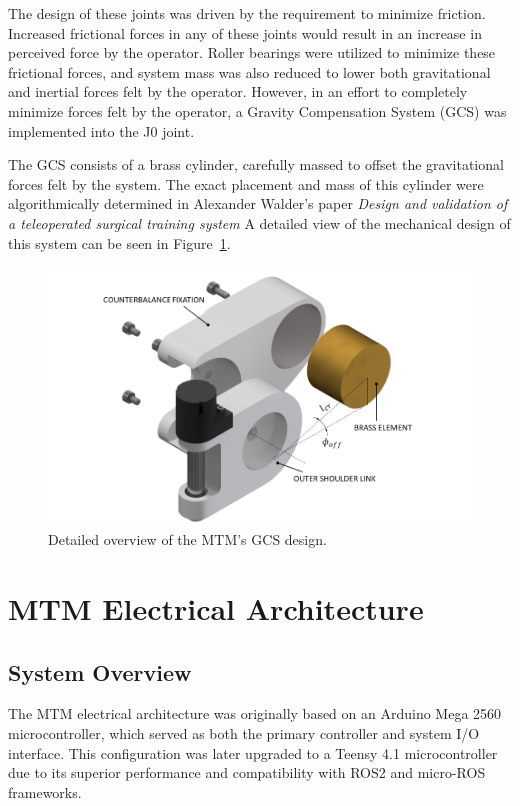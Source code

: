 The design of these joints was driven by the requirement to minimize friction. Increased frictional forces in any of these joints would result in an increase in perceived force by the operator. Roller bearings were utilized to minimize these frictional forces, and system mass was also reduced to lower both gravitational and inertial forces felt by the operator. However, in an effort to completely minimize forces felt by the operator, a Gravity Compensation System (GCS) was implemented into the J0 joint.

The GCS consists of a brass cylinder, carefully massed to offset the gravitational forces felt by the system. The exact placement and mass of this cylinder were algorithmically determined in Alexander Walder's paper \textit{Design and validation of a teleoperated surgical training system} \cite{walder2022design} A detailed view of the mechanical design of this system can be seen in Figure~\ref{fig:GCS_detailed}.

\begin{figure}[H] %
    \centering
    \includegraphics[width=1.0\linewidth]{figures/GCS_detailed.png}
    \caption{Detailed overview of the MTM's GCS design. \cite{walder2022design}}
    \label{fig:GCS_detailed}
\end{figure}

\section{MTM Electrical Architecture}


\subsection{System Overview}
The MTM electrical architecture was originally based on an Arduino Mega 2560 microcontroller, which served as both the primary controller and system I/O interface. This configuration was later upgraded to a Teensy 4.1 microcontroller due to its superior performance and compatibility with ROS2 and micro-ROS frameworks.

